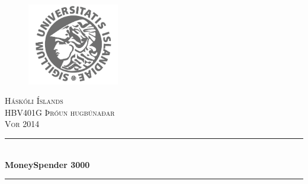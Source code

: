\begin{titlepage}

\newcommand{\HRule}{\rule{\linewidth}{0.5mm}} %

\center %
 
\begin{figure}[h!]
\centering
\includegraphics[width=40mm]{hi.png}
\end{figure}

\textsc{\LARGE Háskóli Íslands}\\[1.5cm] %
\textsc{\Large HBV401G Þróun hugbúnaðar}\\[0.5cm] %
\textsc{\large Vor 2014}\\[0.5cm] %


\HRule \\[0.4cm]
{ \huge \bfseries MoneySpender 3000}\\[0.4cm] %
\HRule \\[1.5cm]
 


\end{titlepage}
